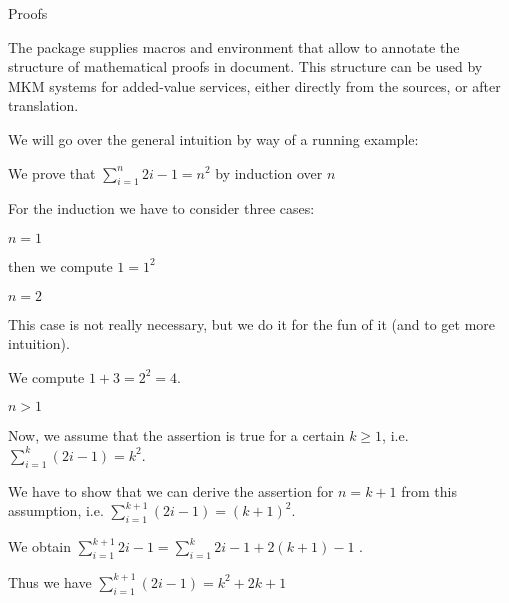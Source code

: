 \begin{sfragment}{Proofs}

The  package supplies macros and environment that allow to annotate the
structure of mathematical proofs in \sTeX document. This structure can be used by MKM
systems for added-value services, either directly from the \sTeX sources, or after
translation.

We will go over the general intuition by way of a running example: 

\begin{latexcode}
\begin{sproof}[id=simple-proof]
   {We prove that $\sum_{i=1}^n{2i-1}=n^{2}$ by induction over $n$}
  \begin{spfcases}{For the induction we have to consider three cases:}
   \begin{spfcase}{$n=1$}
    \begin{spfstep}[type=inline] then we compute $1=1^2$\end{spfstep}
   \end{spfcase}
   \begin{spfcase}{$n=2$}
      \begin{spfcomment}[type=inline]
        This case is not really necessary, but we do it for the
        fun of it (and to get more intuition).
      \end{spfcomment}
      \begin{spfstep}[type=inline] We compute $1+3=2^{2}=4$.\end{spfstep}
   \end{spfcase}
   \begin{spfcase}{$n>1$}
      \begin{spfstep}[type=assumption,id=ind-hyp]
        Now, we assume that the assertion is true for a certain $k\geq 1$,
        i.e. $\sum_{i=1}^k{(2i-1)}=k^{2}$.
      \end{spfstep}
      \begin{spfcomment}
        We have to show that we can derive the assertion for $n=k+1$ from
        this assumption, i.e. $\sum_{i=1}^{k+1}{(2i-1)}=(k+1)^{2}$.
      \end{spfcomment}
      \begin{spfstep}
        We obtain $\sum_{i=1}^{k+1}{2i-1}=\sum_{i=1}^k{2i-1}+2(k+1)-1$
        .
      \end{spfstep}
      \begin{spfstep}
        Thus we have $\sum_{i=1}^{k+1}{(2i-1)}=k^2+2k+1$

\end{spfstep}
\end{spfcase}
\end{spfcases}
\end{sproof}
\end{latexcode}
\end{sfragment}
